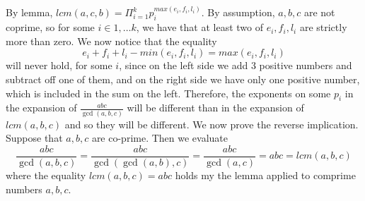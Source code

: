 \documentclass[letterpaper]{article}
\begin{document}
By lemma, $lcm(a,c,b) = \Pi_{i=1}^k p_i^{max(e_i,f_i,l_i)}$. By assumption, $a,b,c$ are not coprime, so for some $i\in{1,\dots k}$, we have that at least two of $e_i,f_i,l_i$ are strictly more than zero. We now notice that the equality $$e_i+f_i+l_i-min(e_i,f_i,l_i) = max(e_i,f_i,l_i)$$ will never hold, for some $i$, since on the left side we add 3 positive numbers and subtract off one of them, and on the right side we have only one positive number, which is included in the sum on the left. 
Therefore, the exponents on some $p_i$ in the expansion of $\frac{abc}{\gcd(a,b,c)}$ will be different than in the expansion of $lcm(a,b,c)$ and so they will be different. We now prove the reverse implication. Suppose that $a,b,c$ are co-prime. Then we evaluate $$\frac{abc}{\gcd(a,b,c)} = \frac{abc}{\gcd(\gcd(a,b),c)} = \frac{abc}{\gcd(a,c)} = abc = lcm(a,b,c)$$ where the equality $lcm(a,b,c)=abc$ holds my the lemma applied to comprime numbers $a,b,c$.
\end{document}
